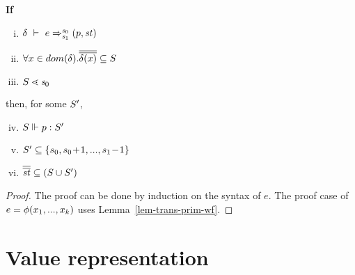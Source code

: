 \begin{thm} \label{thm-trans-wf}
	\textbf{If} 
	\begin{enumerate}[(i)]
		\item $\Trans{\del}{e}{\s_0}{\s_1}{\sfun{p}{\st}}$ 
		\item $\forall x \in dom(\del). \olol{\del(x)} \subseteq \S$ 
		\item  $\S \.< \s_0  $
	\end{enumerate}
	then, for some $\S'$,
	\begin{enumerate}[(i)]
		\setcounter{enumi} {3}
		\item $\wf{p}{\S}{\S'}$
		\item $\S' \subseteq \{s_0,s_0\!+\!1,...,s_1\!-\!1\}$
		\item  $\olol{\st} \subseteq (\S \cup \S')$
	\end{enumerate} 
\end{thm}
\begin{proof}
  The proof  can be done by induction on the syntax of $e$. The proof case of $e= \hcall(x_1,...,x_k)$  uses Lemma~\ref{lem-trans-prim-wf}.
\end{proof}


\section{Value representation}

